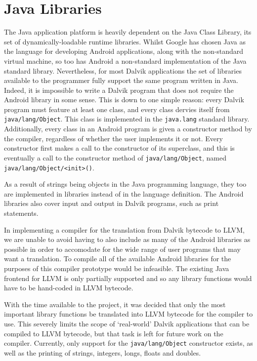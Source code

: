 \section {Java Libraries}
\label{sec:javalib}

The Java application platform is heavily dependent on the Java Class Library, its set of dynamically-loadable runtime libraries. Whilst Google has chosen Java as the language for developing Android applications, along with the non-standard virtual machine, so too has Android a non-standard implementation of the Java standard library. Nevertheless, for most Dalvik applications the set of libraries available to the programmer fully support the same program written in Java. Indeed, it is impossible to write a Dalvik program that does not require the Android library in some sense. This is down to one simple reason: every Dalvik program must feature at least one class, and every class dervies itself from \verb|java/lang/Object|. This class is implemented in the \verb|java.lang| standard library. Additionally, every class in an Android program is given a constructor method by the compiler, regardless of whether the user implements it or not. Every constructor first makes a call to the constructor of its superclass, and this is eventually a call to the constructor method of \verb|java/lang/Object|, named \verb|java/lang/Object/<init>()|.

As a result of strings being objects in the Java programming language, they too are implemented in libraries instead of in the language definition. The Android libraries also cover input and output in Dalvik programs, such as print statements.

In implementing a compiler for the translation from Dalvik bytecode to LLVM, we are unable to avoid having to also include as many of the Android libraries as possible in order to accomodate for the wide range of user programs that may want a translation. To compile all of the available Android libraries for the purposes of this compiler prototype would be infeasible. The existing Java frontend for LLVM is only partially supported and so any library functions would have to be hand-coded in LLVM bytecode.

With the time available to the project, it was decided that only the most important library functions be translated into LLVM bytecode for the compiler to use. This severely limits the scope of `real-world' Dalvik applications that can be compiled to LLVM bytecode, but that task is left for future work on the compiler. Currently, only support for the \verb|java/lang/Object| constructor exists, as well as the printing of strings, integers, longs, floats and doubles.
